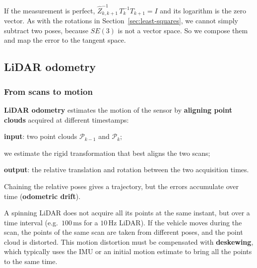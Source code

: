 If the measurement is perfect, $\hat Z_{k,k+1}^{-1}\, T_k^{-1} T_{k+1} = I$ and its logarithm is the zero vector. As with the rotations in Section~\ref{sec:least-squares}, we cannot simply subtract two poses, because $SE(3)$ is not a vector space. So we compose them and map the error to the tangent space.

\subsection{LiDAR odometry}
\subsubsection{From scans to motion}
\textbf{LiDAR odometry} estimates the motion of the sensor by \textbf{aligning point clouds} acquired at different timestamps:
\begin{compactitemize}
    \item \textbf{input}: two point clouds $\mathcal{P}_{k-1}$ and $\mathcal{P}_k$;
    \item we estimate the rigid transformation that best aligns the two scans;
    \item \textbf{output}: the relative translation and rotation between the two acquisition times.
\end{compactitemize}
Chaining the relative poses gives a trajectory, but the errors accumulate over time (\textbf{odometric drift}).

\begin{infobox}
A spinning LiDAR does not acquire all its points at the same instant, but over a time interval (e.g.\ $100\,\mathrm{ms}$ for a $10\,\mathrm{Hz}$ LiDAR). If the vehicle moves during the scan, the points of the same scan are taken from different poses, and the point cloud is distorted. This motion distortion must be compensated with \textbf{deskewing}, which typically uses the IMU or an initial motion estimate to bring all the points to the same time.
\end{infobox}

